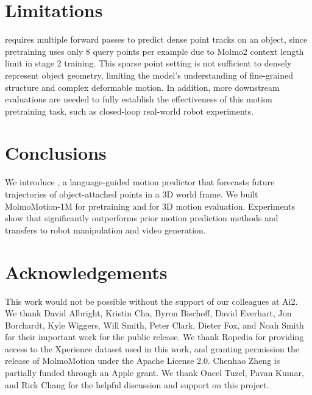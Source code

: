 \section{Limitations} 
\modelname requires multiple forward passes to predict dense point tracks on an object,  since pretraining uses only 8 query points per example due to Molmo2 context length limit in stage 2 training. This sparse point setting is not sufficient to densely represent object geometry, limiting the model's understanding of fine-grained structure and complex deformable motion. In addition, more downstream evaluations are needed to fully establish the effectiveness of this motion pretraining task, such as closed-loop real-world robot experiments. 




\section{Conclusions}
We introduce \modelname, a language-guided motion predictor that forecasts future trajectories of object-attached points in a 3D world frame. We built MolmoMotion-1M for pretraining and \benchmarkname{} for 3D motion evaluation. Experiments show that \modelname significantly outperforms prior motion prediction methods and transfers to robot manipulation and video generation.




\section*{Acknowledgements}

This work would not be possible without the support of our colleagues at Ai2. We thank David Albright, Kristin Cha,  Byron Bischoff, David Everhart, Jon Borchardt, Kyle Wiggers, Will Smith, Peter Clark, Dieter Fox, and Noah Smith for their important work for the \modelname public release. We thank Ropedia for providing access to the Xperience dataset used in this work, and granting permission the release of MolmoMotion under the Apache License 2.0. Chenhao Zheng is partially funded through an Apple grant. We thank Oncel Tuzel, Pavan Kumar, and Rick Chang for the helpful discussion and support on this project.
